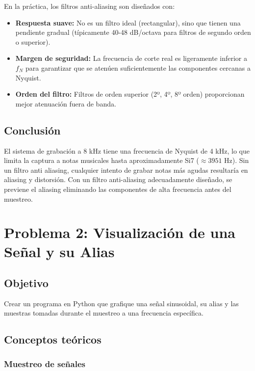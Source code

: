 \documentclass[12pt]{article}
\begin{document}
En la práctica, los filtros anti-aliasing son diseñados con:
 
\begin{itemize}
    \item \textbf{Respuesta suave:} No es un filtro ideal (rectangular), sino que tienen una pendiente gradual (típicamente 40-48 dB/octava para filtros de segundo orden o superior).
    
    \item \textbf{Margen de seguridad:} La frecuencia de corte real es ligeramente inferior a \(f_N\) para garantizar que se atenúen suficientemente las componentes cercanas a Nyquist.
    
    \item \textbf{Orden del filtro:} Filtros de orden superior (2º, 4º, 8º orden) proporcionan mejor atenuación fuera de banda.
\end{itemize}
 
\subsection*{Conclusión}

El sistema de grabación a 8 kHz tiene una frecuencia de Nyquist de 4 kHz, lo que limita la captura a notas musicales hasta aproximadamente Si7 ($\approx 3951$ Hz). Sin un filtro anti aliasing, cualquier intento de grabar notas más agudas resultaría en aliasing y distorsión. Con un filtro anti-aliasing adecuadamente diseñado, se previene el aliasing eliminando las componentes de alta frecuencia antes del muestreo.
 

\section{Problema 2: Visualización de una Señal y su Alias}
 
\subsection*{Objetivo}
 
Crear un programa en Python que grafique una señal sinusoidal, su alias y las muestras tomadas durante el muestreo a una frecuencia específica.
 
\subsection*{Conceptos teóricos}
 
\subsubsection*{Muestreo de señales}
 
\end{document}

